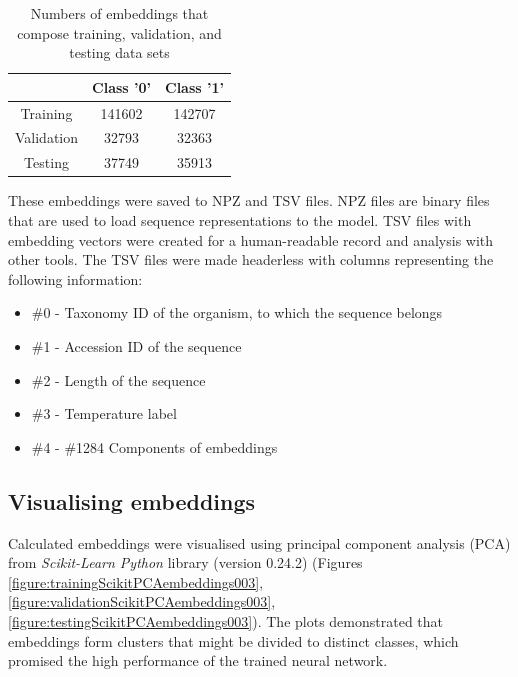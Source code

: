 \documentclass[12pt]{article}
\begin{document}
	\begin{table}[h!]
		\caption{Numbers of embeddings that compose training, 
		validation, and testing data sets}
		\vspace{0.2cm}
		\centering
		\begin{tabular}{ | c c c | }
			\hline 
			& Class '0' & Class '1' \\
			\hline 
			Training & 141602 & 142707 \\
			Validation & 32793 & 32363 \\
			Testing & 37749 & 35913 \\
			\hline    
		\end{tabular}
		\label{table:embeddings003}
	\end{table}

	These embeddings were saved to NPZ and TSV files. NPZ files are binary 
	files that are used to load sequence representations to the model. TSV 
	files with embedding vectors were created for a human-readable record 
	and analysis with other tools. The TSV files were made headerless with 
	columns representing the following information:

	\begin{itemize}
		\item \#0 - Taxonomy ID of the organism, to which the sequence belongs
		\item \#1 - Accession ID of the sequence
		\item \#2 - Length of the sequence
		\item \#3 - Temperature label
		\item \#4 - \#1284 Components of embeddings
	  \end{itemize}

	\subsection{Visualising embeddings}

	Calculated embeddings were visualised using principal component 
	analysis (PCA) from \textit{Scikit-Learn Python} library (version 0.24.2)
	(Figures \ref{figure:trainingScikitPCAembeddings003}, 
	\ref{figure:validationScikitPCAembeddings003},
	\ref{figure:testingScikitPCAembeddings003}). The plots demonstrated that
	embeddings form clusters that might be divided to distinct classes, which
	promised the high performance of the trained neural network.
\end{document}

